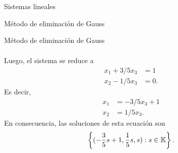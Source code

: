 \begin{chapter}{Sistemas lineales}
\begin{section}{Método de eliminación de Gauss }
\begin{subsection}{Método de eliminación de Gauss}
\begin{ejemplo*}
\begin{multline*}
                    \end{multline*}	
                    Luego,  el sistema se reduce  a
                    \begin{align*}
                    x_1  + 3/5x_3  &= 1\\
                    x_2 -1/5 x_3  &= 0.
                    \end{align*}
                    Es decir, 
                    \begin{align*}
                    x_1    &= - 3/5x_3 + 1\\
                    x_2   &= 1/5 x_3.
                    \end{align*}
                    En consecuencia,  las soluciones de esta ecuación son
                    \begin{equation*}
                    \left\{(-\frac{3}5s + 1, \frac15 s, s ): s \in \mathbb K \right\}.
                    \end{equation*}
                \end{ejemplo*} 
                

\end{subsection}
\end{section}
\end{chapter}
